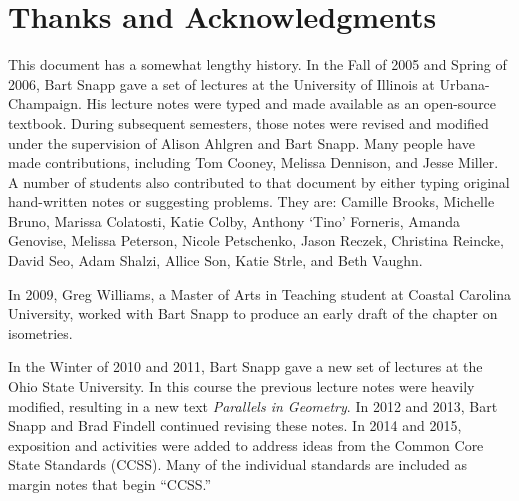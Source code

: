\section*{Thanks and Acknowledgments}

This document has a somewhat lengthy history. In the Fall of 2005 and
Spring of 2006, Bart Snapp gave a set of lectures at the University of
Illinois at Urbana-Champaign. His lecture notes were typed and made
available as an open-source textbook. During subsequent semesters, those notes
were revised and modified under the supervision of Alison Ahlgren and
Bart Snapp. Many people have made contributions,
including Tom Cooney, Melissa Dennison, and Jesse Miller. A number of
students also contributed to that document by either typing original
hand-written notes or suggesting problems. They are: Camille Brooks,
Michelle Bruno, Marissa Colatosti, Katie Colby, Anthony `Tino'
Forneris, Amanda Genovise, Melissa Peterson, Nicole Petschenko, Jason
Reczek, Christina Reincke, David Seo, Adam Shalzi, Allice Son, Katie
Strle, and Beth Vaughn.

In 2009, Greg Williams, a Master of Arts in Teaching student at
Coastal Carolina University, worked with Bart Snapp to produce an
early draft of the chapter on isometries.

In the Winter of 2010 and 2011, Bart Snapp gave a new set of lectures
at the Ohio State University. In this course the previous lecture
notes were heavily modified, resulting in a new text \textit{Parallels
in Geometry}.  In 2012 and 2013, Bart Snapp and Brad Findell 
continued revising these notes.  In 2014 and 2015, exposition and activities were
added to address ideas from the Common Core State Standards (CCSS).  
Many of the individual standards are included as margin notes that 
begin ``CCSS.''  

\makeatletter %
\renewcommand{\l@section}{\@dottedtocline{1}{5em}{5em}}
\renewcommand{\l@subsection}{\@dottedtocline{2}{5em}{5em}}
\renewcommand{\l@subsubsection}{\@dottedtocline{3}{5em}{5em}}
\makeatother


\setcounter{tocdepth}{1}
\tableofcontents

